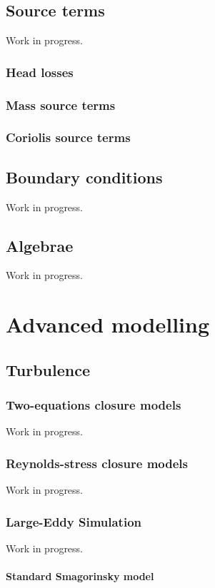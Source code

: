 \documentclass[a4paper,10pt,twoside]{csdoc}
\newcounter{prog}[part]
\begin{document}
\chapter{Source terms}
Work in progress.
\section{Head losses}
\section{Mass source terms}
\section{Coriolis source terms}


\chapter{Boundary conditions}
Work in progress.

\chapter{Algebrae}
Work in progress.


\part{Advanced modelling}
\setcounter{chapter}{0}
\setcounter{section}{0}
\setcounter{equation}{0}
\setcounter{figure}{0}

\chapter{Turbulence}
\section{Two-equations closure models}
Work in progress.
\section{Reynolds-stress closure models}
Work in progress.
\section{Large-Eddy Simulation}
Work in progress.
\subsection{Standard Smagorinsky model}
\end{document}

